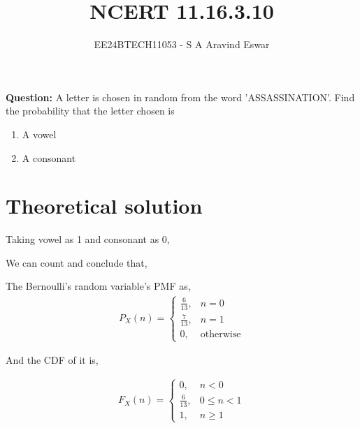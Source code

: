 \documentclass[journal]{IEEEtran}
\begin{document}

\vspace{3cm}

\title{NCERT 11.16.3.10}
\author{EE24BTECH11053 - S A Aravind Eswar}
{\let\newpage\relax\maketitle}

\renewcommand{\thefigure}{\theenumi}
\renewcommand{\thetable}{\theenumi}
\setlength{\intextsep}{10pt} %

\textbf{Question:} A letter is chosen in random from the word 'ASSASSINATION'. Find the probability that the letter chosen is
\begin{enumerate}
    \item A vowel
    \item A consonant
\end{enumerate}

\section{Theoretical solution}
    Taking vowel as 1 and consonant as 0,

    We can count and conclude that,

    The Bernoulli's random variable's PMF as,
    \begin{align}
        P_X(n) = \begin{cases}
            \frac{6}{13},& n=0\\
            \frac{7}{13},& n=1\\
            0,& \text{otherwise}
        \end{cases}
    \end{align}

    And the CDF of it is,

    \begin{align}
        F_X(n) = \begin{cases}
            0,& n<0\\
            \frac{6}{13},& 0\leq n<1\\
            1,&n\geq1
        \end{cases}
    \end{align}
\end{document}
